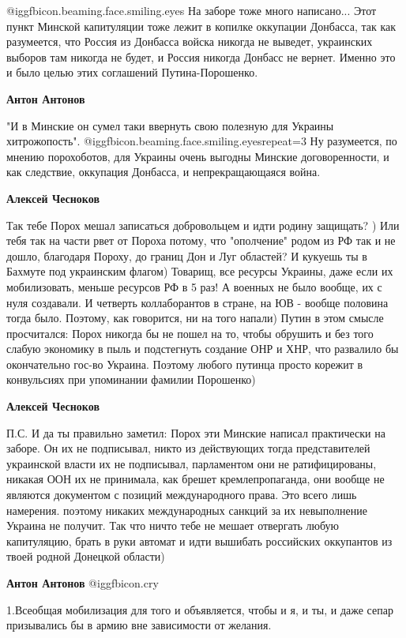 \begin{itemize}
\begin{itemize}
 @igg{fbicon.beaming.face.smiling.eyes}  На заборе тоже много написано... Этот пункт Минской капитуляции тоже лежит в
копилке оккупации Донбасса, так как разумеется, что Россия из Донбасса войска
никогда не выведет, украинских выборов там никогда не будет, и Россия никогда
Донбасс не вернет. Именно это и было целью этих соглашений Путина-Порошенко.

\textbf{Антон Антонов} 

"И в Минские он сумел таки ввернуть свою полезную для Украины хитрожопость".
 @igg{fbicon.beaming.face.smiling.eyes}{repeat=3}  Ну разумеется, по мнению порохоботов, для Украины очень выгодны Минские
договоренности, и как следствие, оккупация Донбасса, и непрекращающаяся война.


\textbf{Алексей Чесноков} 

Так тебе Порох мешал записаться добровольцем и идти родину защищать? ) Или тебя
так на части рвет от Пороха потому, что "ополчение" родом из РФ так и не дошло,
благодаря Пороху, до границ Дон и Луг областей? И кукуешь ты в Бахмуте под
украинским флагом) Товарищ, все ресурсы Украины, даже если их мобилизовать,
меньше ресурсов РФ в 5 раз! А военных не было вообще, их с нуля создавали. И
четверть коллаборантов в стране, на ЮВ - вообще половина тогда было. Поэтому,
как говорится, ни на того напали) Путин в этом смысле просчитался: Порох
никогда бы не пошел на то, чтобы обрушить и без того слабую экономику в пыль и
подстегнуть создание ОНР и ХНР, что развалило бы окончательно гос-во Украина.
Поэтому любого путинца просто корежит в конвульсиях при упоминании фамилии
Порошенко)

\textbf{Алексей Чесноков} 

П.С. И да ты правильно заметил: Порох эти Минские написал практически на
заборе. Он их не подписывал, никто из действующих тогда представителей
украинской власти их не подписывал, парламентом они не ратифицированы, никакая
ООН их не принимала, как брешет кремлепропаганда, они вообще не являются
документом с позиций международного права. Это всего лишь намерения. поэтому
никаких международных санкций за их невыполнение Украина не получит. Так что
ничто тебе не мешает отвергать любую капитуляцию, брать в руки автомат и идти
вышибать российских оккупантов из твоей родной Донецкой области)


\textbf{Антон Антонов}  @igg{fbicon.cry}  

1.Всеобщая мобилизация для того и объявляется, чтобы и я, и ты, и даже сепар
призывались бы в армию вне зависимости от желания. 


\end{itemize}
\end{itemize}
